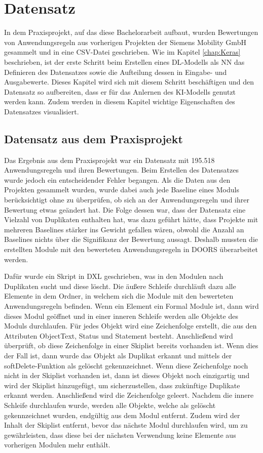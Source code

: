 \chapter{Datensatz}
\label{chap:Datensatz}
In dem Praxisprojekt, auf das diese Bachelorarbeit aufbaut, wurden Bewertungen von Anwendungsregeln aus vorherigen Projekten der Siemens Mobility GmbH gesammelt und in eine CSV-Datei geschrieben.
Wie im Kapitel \ref{chap:Keras} beschrieben, ist der erste Schritt beim Erstellen eines \ac{DL}-Modells als \ac{NN} das Definieren des Datensatzes sowie die Aufteilung
dessen in Eingabe- und Ausgabewerte. Dieses Kapitel wird sich mit diesem Schritt beschäftigen und den Datensatz so aufbereiten, dass er für das Anlernen des \ac{KI}-Modells genutzt werden
kann. Zudem werden in diesem Kapitel wichtige Eigenschaften des Datensatzes visualisiert.

\section{Datensatz aus dem Praxisprojekt}
Das Ergebnis aus dem Praxisprojekt war ein Datensatz mit 195.518 Anwendungsregeln und ihren Bewertungen. Beim Erstellen des Datensatzes wurde jedoch ein entscheidender Fehler begangen.
Als die Daten aus den Projekten gesammelt wurden, wurde dabei auch jede Baseline eines Moduls berücksichtigt ohne zu überprüfen, ob sich an der Anwendungsregeln und ihrer Bewertung
etwas geändert hat. Die Folge dessen war, dass der Datensatz eine Vielzahl von Duplikaten enthalten hat, was dazu geführt hätte, dass Projekte mit mehreren Baselines 
stärker ins Gewicht gefallen wären, obwohl die Anzahl an Baselines nichts über die Signifikanz der Bewertung aussagt. Deshalb mussten die erstellten Module mit den bewerteten Anwendungsregeln
in \ac{DOORS} überarbeitet werden. 

Dafür wurde ein Skript in \ac{DXL} geschrieben, was in den Modulen nach Duplikaten sucht und diese löscht. Die äußere Schleife durchläuft dazu alle 
Elemente in dem Ordner, in welchem sich die Module mit den bewerteten Anwendungsregeln befinden. Wenn ein Element ein Formal Module ist, 
dann wird dieses Modul geöffnet und in einer inneren Schleife werden alle Objekte des Moduls durchlaufen. Für jedes Objekt wird eine 
Zeichenfolge erstellt, die aus den Attributen ObjectText, Status und Statement besteht. Anschließend wird überprüft, ob diese Zeichenfolge
in einer Skiplist bereits vorhanden ist. Wenn dies der Fall ist, dann wurde das Objekt als Duplikat erkannt und mittels der softDelete-Funktion
als gelöscht gekennzeichnet. Wenn diese Zeichenfolge noch nicht in der Skiplist vorhanden ist, dann ist dieses Objekt noch einzigartig und wird der Skiplist
hinzugefügt, um sicherzustellen, dass zukünftige Duplikate erkannt werden. Anschließend wird die Zeichenfolge geleert. Nachdem die innere Schleife durchlaufen wurde,
werden alle Objekte, welche als gelöscht gekennzeichnet wurden, endgültig aus dem Modul entfernt. Zudem wird der Inhalt der Skiplist entfernt, bevor das nächste Modul durchlaufen wird, um 
zu gewährleisten, dass diese bei der nächsten Verwendung keine Elemente aus vorherigen Modulen mehr enthält.

